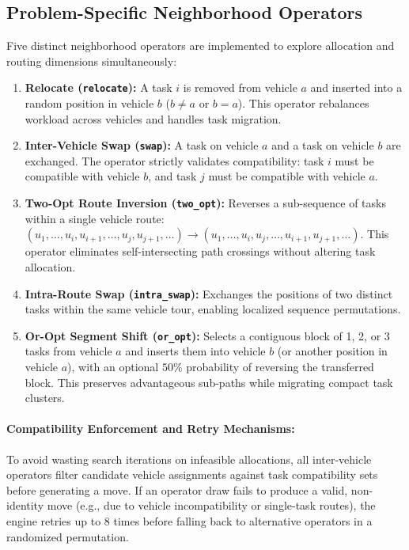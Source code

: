 \subsection{Problem-Specific Neighborhood Operators}
Five distinct neighborhood operators are implemented to explore allocation and routing dimensions simultaneously:
\begin{enumerate}
    \item \textbf{Relocate (\texttt{relocate}):} A task $i$ is removed from vehicle $a$ and inserted into a random position in vehicle $b$ ($b \ne a$ or $b = a$). This operator rebalances workload across vehicles and handles task migration.
    \item \textbf{Inter-Vehicle Swap (\texttt{swap}):} A task on vehicle $a$ and a task on vehicle $b$ are exchanged. The operator strictly validates compatibility: task $i$ must be compatible with vehicle $b$, and task $j$ must be compatible with vehicle $a$.
    \item \textbf{Two-Opt Route Inversion (\texttt{two\_opt}):} Reverses a sub-sequence of tasks within a single vehicle route: $(u_1, \dots, u_i, u_{i+1}, \dots, u_j, u_{j+1}, \dots) \to (u_1, \dots, u_i, u_j, \dots, u_{i+1}, u_{j+1}, \dots)$. This operator eliminates self-intersecting path crossings without altering task allocation.
    \item \textbf{Intra-Route Swap (\texttt{intra\_swap}):} Exchanges the positions of two distinct tasks within the same vehicle tour, enabling localized sequence permutations.
    \item \textbf{Or-Opt Segment Shift (\texttt{or\_opt}):} Selects a contiguous block of 1, 2, or 3 tasks from vehicle $a$ and inserts them into vehicle $b$ (or another position in vehicle $a$), with an optional $50\%$ probability of reversing the transferred block. This preserves advantageous sub-paths while migrating compact task clusters.
\end{enumerate}

\paragraph{Compatibility Enforcement and Retry Mechanisms:} To avoid wasting search iterations on infeasible allocations, all inter-vehicle operators filter candidate vehicle assignments against task compatibility sets before generating a move. If an operator draw fails to produce a valid, non-identity move (e.g., due to vehicle incompatibility or single-task routes), the engine retries up to 8 times before falling back to alternative operators in a randomized permutation.

